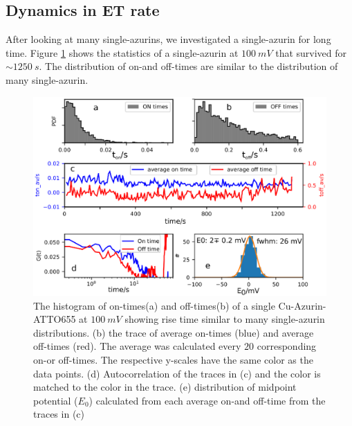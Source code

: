 \documentclass[journal=jacsat,manuscript=article]{achemso}
\begin{document}
\subsection{Dynamics in ET rate}
After looking at many single-azurins, we investigated a single-azurin for long time. 
Figure \ref{fig:long_azurin_trace} shows the statistics of a single-azurin at $100~mV$ that survived 
for ${\sim}1250~s$. The distribution of on-and off-times are similar to the distribution of many single-azurin.
\begin{figure}
	\centering
	\includegraphics[width=\textwidth]{long_azurin_trace.eps}
	\caption{The histogram of on-times(a) and off-times(b) of a single Cu-Azurin-ATTO655 at $100~mV$ showing rise time 
	similar to many single-azurin distributions. (b) the trace of average on-times (blue) and average off-times (red). 
	The average was calculated every $20$ corresponding on-or off-times. The respective y-scales have the same color 
	as the data points. (d) Autocorrelation of the traces in (c) and the color is matched to the color in the trace. 
	(e) distribution of midpoint potential ($E_0$) calculated from each average on-and off-time from the traces in (c)}
	\label{fig:long_azurin_trace}
\end{figure}
\end{document}

